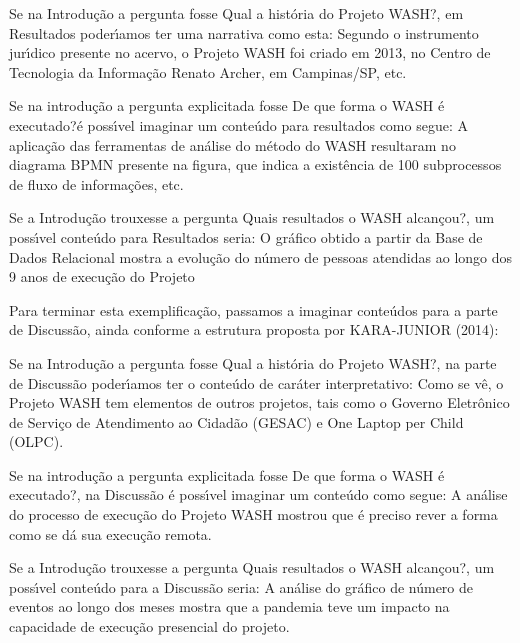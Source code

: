 \documentclass[
12pt,		%
openright,	%
twoside,  %
a4paper,			%
chapter=TITLE,		%
english,			%
french,				%
spanish,			%
brazil				%
]{USPSC-classe/USPSC}
\begin{document}
\begin{alineas}
\item Se na Introdu\c{c}\~ao a pergunta fosse \textquotedbl Qual a hist\'oria do Projeto WASH?\textquotedbl , em Resultados poder\'{\i}amos ter uma narrativa como esta: \textquotedbl Segundo o instrumento jur\'{\i}dico presente no acervo, o Projeto WASH foi criado em 2013, no Centro de Tecnologia da Informa\c{c}\~ao Renato Archer, em Campinas/SP, etc.\textquotedbl 
\item Se na introdu\c{c}\~ao a pergunta explicitada fosse \textquotedbl De que forma o WASH \'e executado?\textquotedbl  \'e poss\'{\i}vel imaginar um conte\'udo para resultados como segue: \textquotedbl A aplica\c{c}\~ao das ferramentas de an\'alise do m\'etodo do WASH resultaram no diagrama BPMN presente na figura, que indica a exist\^encia de 100 subprocessos de fluxo de informa\c{c}\~oes, etc.\textquotedbl 
\item Se a Introdu\c{c}\~ao trouxesse a pergunta \textquotedbl Quais resultados o WASH alcan\c{c}ou?\textquotedbl , um poss\'{\i}vel conte\'udo para Resultados seria: \textquotedbl O gr\'afico obtido a partir da Base de Dados Relacional mostra a evolu\c{c}\~ao do n\'umero de pessoas atendidas ao longo dos 9 anos de execu\c{c}\~ao do Projeto\textquotedbl 
\end{alineas}

Para terminar esta exemplifica\c{c}\~ao, passamos a imaginar conte\'udos para a parte de Discuss\~ao, ainda conforme a estrutura proposta por  KARA-JUNIOR (2014):















\begin{alineas}
\item Se na Introdu\c{c}\~ao a pergunta fosse \textquotedbl Qual a hist\'oria do Projeto WASH?\textquotedbl , na parte de Discuss\~ao poder\'{\i}amos ter o conte\'udo de car\'ater interpretativo: \textquotedbl Como se v\^e, o Projeto WASH tem elementos de outros projetos, tais como o Governo Eletr\^onico de Servi\c{c}o de Atendimento ao Cidad\~ao (GESAC) e One Laptop per Child (OLPC)\textquotedbl .
\item Se na introdu\c{c}\~ao a pergunta explicitada fosse \textquotedbl De que forma o WASH \'e executado?\textquotedbl , na Discuss\~ao \'e poss\'{\i}vel imaginar um conte\'udo como segue: \textquotedbl A an\'alise do processo de execu\c{c}\~ao do Projeto WASH mostrou que \'e preciso rever a forma como se d\'a sua execu\c{c}\~ao remota\textquotedbl .
\item Se a Introdu\c{c}\~ao trouxesse a pergunta \textquotedbl Quais resultados o WASH alcan\c{c}ou?\textquotedbl , um poss\'{\i}vel conte\'udo para a Discuss\~ao seria: \textquotedbl A an\'alise do gr\'afico de n\'umero de eventos ao longo dos meses mostra que a pandemia teve um impacto na capacidade de execu\c{c}\~ao presencial do projeto.\textquotedbl 
\end{alineas}
\end{document}
